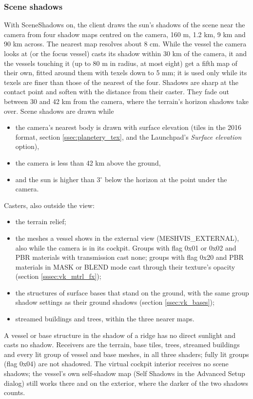 \documentclass[Orbiter Developer Manual.tex]{subfiles}
\begin{document}
\begin{sloppypar}
\subsubsection{Scene shadows}
With SceneShadows on, the client draws the sun's shadows of the scene near the camera from four shadow maps centred on the camera, 160 m, 1.2 km, 9 km and 90 km across. The nearest map resolves about 8 cm. While the vessel the camera looks at (or the focus vessel) casts its shadow within 30 km of the camera, it and the vessels touching it (up to 80 m in radius, at most eight) get a fifth map of their own, fitted around them with texels down to 5 mm; it is used only while its texels are finer than those of the nearest of the four. Shadows are sharp at the contact point and soften with the distance from their caster. They fade out between 30 and 42 km from the camera, where the terrain's horizon shadows take over. Scene shadows are drawn while

\begin{itemize}
\item the camera's nearest body is drawn with surface elevation (tiles in the 2016 format, section \ref{ssec:planetery_tex}, and the Launchpad's \textit{Surface elevation} option),
\item the camera is less than 42 km above the ground,
\item and the sun is higher than 3$^{\circ}$ below the horizon at the point under the camera.
\end{itemize}

\noindent
Casters, also outside the view:

\begin{itemize}
\item the terrain relief;
\item the meshes a vessel shows in the external view (MESHVIS\_\allowbreak EXTERNAL), also while the camera is in its cockpit. Groups with flag 0x01 or 0x02 and PBR materials with transmission cast none; groups with flag 0x20 and PBR materials in MASK or BLEND mode cast through their texture's opacity (section \ref{sssec:vk_mtrl_fx});
\item the structures of surface bases that stand on the ground, with the same group shadow settings as their ground shadows (section \ref{ssec:vk_bases});
\item streamed buildings and trees, within the three nearer maps.
\end{itemize}

\noindent
A vessel or base structure in the shadow of a ridge has no direct sunlight and casts no shadow. Receivers are the terrain, base tiles, trees, streamed buildings and every lit group of vessel and base meshes, in all three shaders; fully lit groups (flag 0x04) are not shadowed. The virtual cockpit interior receives no scene shadows; the vessel's own self-shadow map (Self Shadows in the Advanced Setup dialog) still works there and on the exterior, where the darker of the two shadows counts.



\end{sloppypar}
\end{document}
